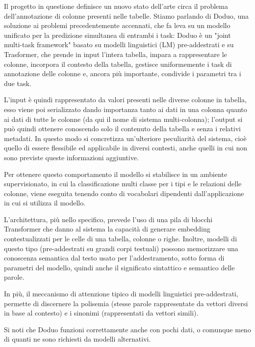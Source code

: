 Il progetto in questione definisce un nuovo stato dell'arte circa il problema dell'annotazione di colonne presenti nelle tabelle. Stiamo parlando di Doduo, una soluzione ai problemi precedentemente accennati, che fa leva su un modello unificato per la predizione simultanea di entrambi i task: Doduo è un "joint multi-task framework" basato su modelli linguistici (LM) pre-addestrati e su Trasformer, che prende in input l'intera tabella, impara a rappresentare le colonne, incorpora il contesto della tabella, gestisce uniformemente i task di annotazione delle colonne e, ancora più importante, condivide i parametri tra i due task. 

L'input è quindi rappresentato da valori presenti nelle diverse colonne in tabella, esso viene poi serializzato dando importanza tanto ai dati in una colonna quanto ai dati di tutte le colonne (da qui il nome di sistema multi-colonna); l'output si può quindi ottenere conoscendo solo il contenuto della tabella e senza i relativi metadati. In questo modo si concretizza un'ulteriore peculiarità del sistema, cioè quello di essere flessibile ed applicabile in diversi contesti, anche quelli in cui non sono previste queste informazioni aggiuntive. 

Per ottenere questo comportamento il modello si stabilisce in un ambiente supervisionato, in cui la classificazione multi classe per i tipi e le relazioni delle colonne, viene eseguita tenendo conto di vocabolari dipendenti dall'applicazione in cui si utilizza il modello.

L'architettura, più nello specifico, prevede l'uso di una pila di blocchi Transformer che danno al sistema la capacità di generare embedding contestualizzati per le celle di una tabella, colonne o righe. Inoltre, modelli di questo tipo (pre-addestrati su grandi corpi testuali) possono memorizzare una conoscenza semantica dal testo usato per l'addestramento, sotto forma di parametri del modello, quindi anche il significato sintattico e semantico delle parole.

In più, il meccanismo di attenzione tipico di modelli linguistici pre-addestrati, permette di discernere la polisemia (stesse parole rappresentate da vettori diversi in base al contesto) e i sinonimi (rappresentati da vettori simili).

Si noti che Doduo funzioni correttamente anche con pochi dati, o comunque meno di quanti ne sono richiesti da modelli alternativi.